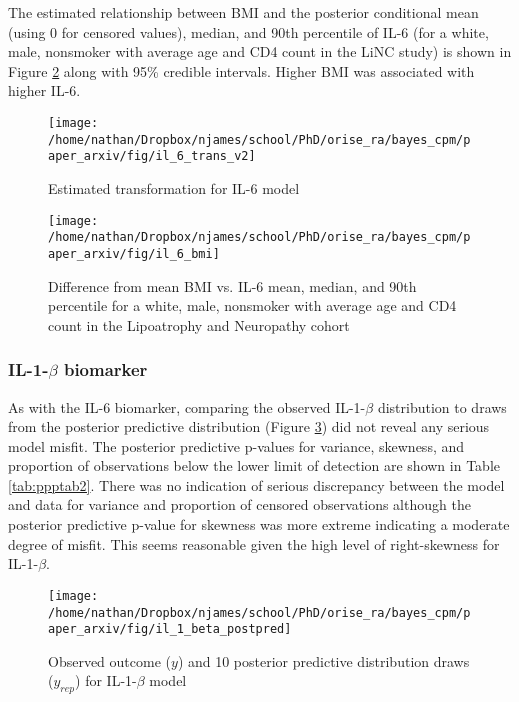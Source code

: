 \documentclass[
]{article}
\begin{document}
The estimated relationship between BMI and the posterior conditional mean (using 0 for censored values), median, and 90th percentile of IL-6 (for a white, male, nonsmoker with average age and CD4 count in the LiNC study) is shown in Figure \ref{fig:il6-bmi} along with 95\% credible intervals. Higher BMI was associated with higher IL-6.

\begin{figure}

{\centering \texttt{[image: /home/nathan/Dropbox/njames/school/PhD/orise\_ra/bayes\_cpm/paper\_arxiv/fig/il\_6\_trans\_v2]} 

}

\caption{Estimated transformation for IL-6 model}\label{fig:il-6-trans-1}
\end{figure}

\begin{figure}

{\centering \texttt{[image: /home/nathan/Dropbox/njames/school/PhD/orise\_ra/bayes\_cpm/paper\_arxiv/fig/il\_6\_bmi]} 

}

\caption{Difference from mean BMI vs. IL-6 mean, median, and 90th percentile for a white, male, nonsmoker with average age and CD4 count in the Lipoatrophy and Neuropathy cohort}\label{fig:il6-bmi}
\end{figure}

\hypertarget{il-1-beta-biomarker}{%
\subsubsection{\texorpdfstring{IL-1-\(\beta\) biomarker}{IL-1-\textbackslash beta biomarker}}\label{il-1-beta-biomarker}}

As with the IL-6 biomarker, comparing the observed IL-1-\(\beta\) distribution to draws from the posterior predictive distribution (Figure \ref{fig:il-1-beta-postpred}) did not reveal any serious model misfit. The posterior predictive p-values for variance, skewness, and proportion of observations below the lower limit of detection are shown in Table \ref{tab:ppptab2}. There was no indication of serious discrepancy between the model and data for variance and proportion of censored observations although the posterior predictive p-value for skewness was more extreme indicating a moderate degree of misfit. This seems reasonable given the high level of right-skewness for IL-1-\(\beta\).

\begin{figure}

{\centering \texttt{[image: /home/nathan/Dropbox/njames/school/PhD/orise\_ra/bayes\_cpm/paper\_arxiv/fig/il\_1\_beta\_postpred]} 

}

\caption{Observed outcome ($y$) and 10 posterior predictive distribution draws ($y_{rep}$) for IL-1-$\beta$ model}\label{fig:il-1-beta-postpred}
\end{figure}
\end{document}
